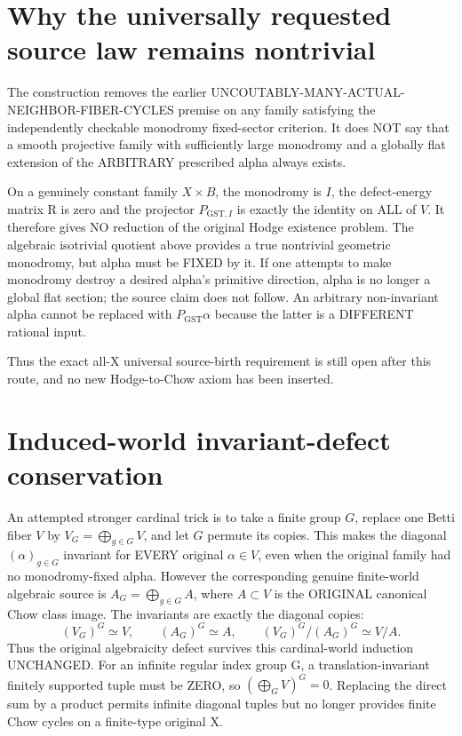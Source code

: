\documentclass[11pt]{article}
\begin{document}
\section{Why the universally requested source law remains nontrivial}
The construction removes the earlier
UNCOUTABLY-MANY-ACTUAL-NEIGHBOR-FIBER-CYCLES
premise on any family satisfying the
independently checkable monodromy
fixed-sector criterion.
It does NOT say that a smooth projective
family with sufficiently large monodromy
and a globally flat extension of the
ARBITRARY prescribed alpha always exists.

On a genuinely constant family $X\times B$,
the monodromy is $I$, the defect-energy
matrix R is zero and the projector
$P_{\mathrm{GST},I}$ is exactly the
identity on ALL of $V$. It therefore
gives NO reduction of the original
Hodge existence problem.
The algebraic isotrivial quotient above
provides a true nontrivial geometric
monodromy, but alpha must be FIXED by it.
If one attempts to make monodromy
destroy a desired alpha's primitive
direction, alpha is no longer a global
flat section; the source claim does not
follow. An arbitrary non-invariant
alpha cannot be replaced with
$P_{\mathrm{GST}}\alpha$ because the
latter is a DIFFERENT rational input.

Thus the exact all-X universal
source-birth requirement is still
open after this route, and no new
Hodge-to-Chow axiom has been inserted.


\section{Induced-world invariant-defect conservation}
An attempted stronger cardinal trick is to take a finite group
\(G\), replace one Betti fiber \(V\) by \(V_G=\bigoplus_{g\in G}V\),
and let \(G\) permute its copies. This makes the diagonal
\((\alpha)_{g\in G}\) invariant for EVERY original
\(\alpha\in V\), even when the original family had no
monodromy-fixed alpha. However the corresponding genuine
finite-world algebraic source is
\(A_G=\bigoplus_{g\in G}A\), where \(A\subset V\)
is the ORIGINAL canonical Chow class image.
The invariants are exactly the diagonal copies:
\[
(V_G)^G\simeq V,\qquad (A_G)^G\simeq A,
\qquad
\boxed{(V_G)^G/(A_G)^G\simeq V/A.}
\]
Thus the original algebraicity defect survives
this cardinal-world induction UNCHANGED.
For an infinite regular index group G, a
translation-invariant finitely supported tuple
must be ZERO, so
\((\bigoplus_G V)^G=0\).
Replacing the direct sum by a product permits
infinite diagonal tuples but no longer provides
finite Chow cycles on a finite-type original X.
\end{document}
